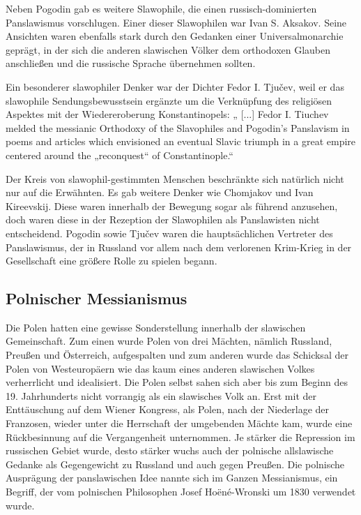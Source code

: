 \documentclass{../../sem_paper}
\begin{document}
Neben Pogodin gab es weitere Slawophile, die einen russisch-dominierten Panslawismus
vorschlugen. Einer dieser Slawophilen war Ivan S. Aksakov. Seine Ansichten waren ebenfalls
stark durch den Gedanken einer Universalmonarchie geprägt, in der sich die anderen
slawischen Völker dem orthodoxen Glauben anschließen und die russische Sprache
übernehmen sollten.\autocite[232]{nicoll}

Ein besonderer slawophiler Denker war der Dichter Fedor I. Tjučev, weil er das slawophile
Sendungsbewusstsein ergänzte um die Verknüpfung des religiösen Aspektes mit der
Wiedereroberung Konstantinopels: „ [...] Fedor I. Tiuchev melded the messianic Orthodoxy
of the Slavophiles and Pogodin's Panslavism in poems and articles which envisioned an
eventual Slavic triumph in a great empire centered around the „reconquest“ of
Constantinople.“\autocite[232]{nicoll}

Der Kreis von slawophil-gestimmten Menschen beschränkte sich natürlich nicht nur auf die
Erwähnten. Es gab weitere Denker wie Chomjakov und Ivan Kireevskij. Diese waren
innerhalb der Bewegung sogar als führend anzusehen\autocite[132]{kohn}, doch waren
diese in der Rezeption der Slawophilen als Panslawisten nicht entscheidend. Pogodin sowie
Tjučev waren die hauptsächlichen Vertreter des Panslawismus, der in Russland vor allem
nach dem verlorenen Krim-Krieg in der Gesellschaft eine größere Rolle zu spielen begann.

\subsection{Polnischer Messianismus}
Die Polen hatten eine gewisse Sonderstellung innerhalb der slawischen Gemeinschaft. Zum
einen wurde  Polen von drei Mächten, nämlich Russland,
Preußen und Österreich, aufgespalten und zum anderen wurde das Schicksal der Polen von
Westeuropäern wie das kaum eines anderen slawischen Volkes verherrlicht und idealisiert.
Die Polen selbst sahen sich aber bis zum Beginn des 19. Jahrhunderts nicht vorrangig als ein
slawisches Volk an. Erst mit der Enttäuschung auf dem Wiener Kongress, als Polen, nach der
Niederlage der Franzosen, wieder unter die Herrschaft der umgebenden Mächte kam, wurde
eine Rückbesinnung auf die Vergangenheit unternommen. Je stärker die Repression im
russischen Gebiet wurde, desto stärker wuchs auch der polnische allslawische Gedanke als
Gegengewicht zu Russland und auch gegen Preußen.\autocite[252]{falkovic} Die polnische
Ausprägung der panslawischen Idee nannte sich im Ganzen Messianismus, ein Begriff, der
vom polnischen Philosophen Josef Hoëné-Wronski um 1830 verwendet wurde.
\end{document}
